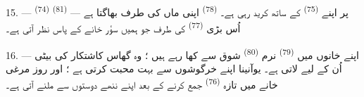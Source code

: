 15. ---  \textsuperscript{(74)} 
\textsuperscript{(81)} پر اپنے  \textsuperscript{(75)}
کے ساتھ کرید رہی ہے۔  \textsuperscript{(78)} اپنی
ماں کی طرف بھاگتا ہے — اُس بڑی 
\textsuperscript{(77)} کی طرف جو ہمیں سؤر خانے کے پاس نظر آتی ہے۔

16. --- اپنے خانوں میں  \textsuperscript{(79)} نرم
 \textsuperscript{(80)} شوق سے کھا رہے ہیں ؛ وہ گھاس
کاشتکار کی بیٹی اُن کے لیے لاتی ہے۔ یوآنینا اپنے خرگوشوں سے بہت
محبت کرتی ہے ؛ اور روز مرغی خانے میں تازہ 
\textsuperscript{(76)} جمع کرنے کے بعد اپنے ننھے دوستوں سے ملنے آتی
ہے۔

\VUsaut{6.0mm}
\VUfilet{22mm}
